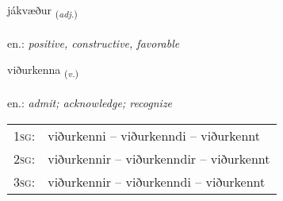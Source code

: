 \documentclass[frontgrid, backgrid]{flacards}\usepackage[]{graphicx}\usepackage[]{xcolor}
\begin{document}
\renewcommand{\flhead}{\vskip5pt \fboxsep=0pt {\small\bfseries\footnotesize Lýsingarorð | Adjective}}
\renewcommand{\fcfoot}{\vskip5pt \fboxsep=0pt \hspace{2pt}{\small\bfseries\footnotesize 1K}}

\renewcommand{\blhead}{\vskip5pt {\small\bfseries\footnotesize Lýsingarorð | Adjective }}
\renewcommand{\bcfoot}{\vskip5pt \hspace{2pt}{\small\bfseries\footnotesize 1K}}


{jákvæður \small{\textsubscript{(\textit{adj.})}} \\[1ex] %
\textphonetic{[jauːkʰvaiðʏr]} \\
en.: \emph{positive, constructive, favorable} \\  [2ex]
\renewcommand*{\arraystretch}{0.8}
}

\renewcommand{\flhead}{\vskip5pt \fboxsep=0pt {\small\bfseries\footnotesize Sagnorð | Verb}}
\renewcommand{\fcfoot}{\vskip5pt \fboxsep=0pt \hspace{2pt}{\small\bfseries\footnotesize 1K}}

\renewcommand{\blhead}{\vskip5pt {\small\bfseries\footnotesize Sagnorð | Verb }}
\renewcommand{\bcfoot}{\vskip5pt \hspace{2pt}{\small\bfseries\footnotesize 1K}}


{viðurkenna \small{\textsubscript{(\textit{v.})}} \\[1ex] %
 \\
en.: \emph{admit; acknowledge; recognize} \\  [2ex]
\renewcommand*{\arraystretch}{0.8}
\begin{tabular}{p{1cm}l}
\textsc{1sg}: & viðurkenni -- viðurkenndi -- viðurkennt \\ 
\textsc{2sg}: & viðurkennir -- viðurkenndir -- viðurkennt \\ 
\textsc{3sg}: & viðurkennir -- viðurkenndi -- viðurkennt \\ 
\end{tabular}
}
\end{document}
